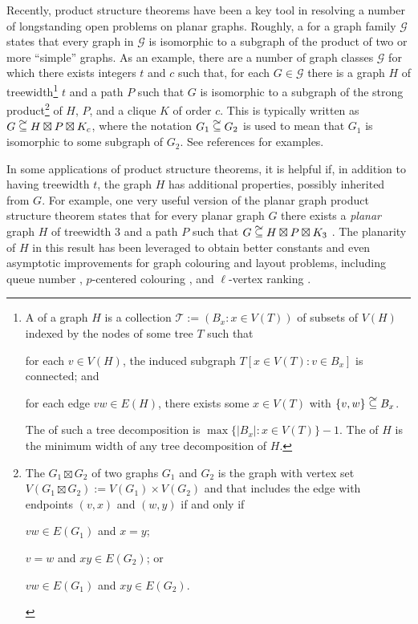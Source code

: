 \documentclass{patmorin}
\newcommand\subsetcong{\mathrel{\text{%
    \setbox0\hbox{$\subseteq$}%
    \rlap{\hbox to \wd0{\hss\hss\hss\raisebox{1.5\height}{$\sim$}\hss}}\box0
}}}
\begin{document}
Recently, product structure theorems have been a key tool in resolving a number of longstanding open problems on planar graphs.  Roughly, a  for a graph family $\mathcal{G}$ states that every graph in $\mathcal{G}$ is isomorphic to a subgraph of the product of two or more ``simple'' graphs.  As an example, there are a number of graph classes $\mathcal{G}$ for which there exists integers $t$ and $c$ such that, for each $G\in\mathcal{G}$ there is a graph $H$ of treewidth\footnote{A  of a graph $H$ is a collection $\mathcal{T}:=(B_x:x\in V(T))$ of subsets of $V(H)$ indexed by the nodes of some tree $T$ such that
\begin{inparaenum}[(i)]
  \item for each $v\in V(H)$, the induced subgraph $T[x\in V(T):v\in B_x]$ is connected; and
  \item for each edge $vw\in E(H)$, there exists some $x\in V(T)$ with $\{v,w\}\subsetcong B_x$.
\end{inparaenum}
The  of such a tree decomposition is $\max\{|B_x|:x\in V(T)\}-1$. The  of $H$ is the minimum width of any tree decomposition of $H$.} $t$ and a path $P$ such that $G$ is isomorphic to a subgraph of the strong product\footnote{The  $G_1\boxtimes G_2$ of two graphs $G_1$ and $G_2$ is the graph with vertex set $V(G_1\boxtimes G_2):=V(G_1)\times V(G_2)$ and that includes the edge with endpoints $(v,x)$ and $(w,y)$ if and only if
\begin{inparaenum}[(i)]
  \item $vw\in E(G_1)$ and $x=y$;
  \item $v=w$ and $xy\in E(G_2)$; or
  \item $vw\in E(G_1)$ and $xy\in E(G_2)$.
\end{inparaenum}
} of $H$, $P$, and a clique $K$ of order $c$.
This is typically written as $G\subsetcong H\boxtimes P\boxtimes K_c$, where the notation $G_1\subsetcong G_2$ is used to mean that $G_1$ is isomorphic to some subgraph of $G_2$.  See references \cite{dujmovic.joret.ea:planar,dujmovic.morin.ea:structure,krauthgamer.lee:intrinsic,ueckerdt.wood.ea:improved,bose.morin.ea:optimal,campbell.clinch.ea:product,illingworth.scott.ea:alon,distel.hickingbotham.ea:improved,hickingbotham.jungeblut.ea:product,hickingbotham.wood:shallow,wood:product} for examples.

In some applications of product structure theorems, it is helpful if, in addition to having treewidth $t$, the graph $H$ has additional properties, possibly inherited from $G$.  For example, one very useful version of the planar graph product structure theorem states that for every planar graph $G$ there exists a \emph{planar} graph $H$ of treewidth $3$ and a path $P$ such that $G\subsetcong H\boxtimes P\boxtimes K_3$ \cite[Theorem~36(b)]{dujmovic.joret.ea:planar}.  The planarity of $H$ in this result has been leveraged to obtain better constants and even asymptotic improvements for graph colouring and layout problems, including queue number \cite{dujmovic.joret.ea:planar}, $p$-centered colouring \cite{debski.felsner.ea:improved}, and $\ell$-vertex ranking \cite{bose.dujmovic.ea:asymptotically}.
\end{document}
